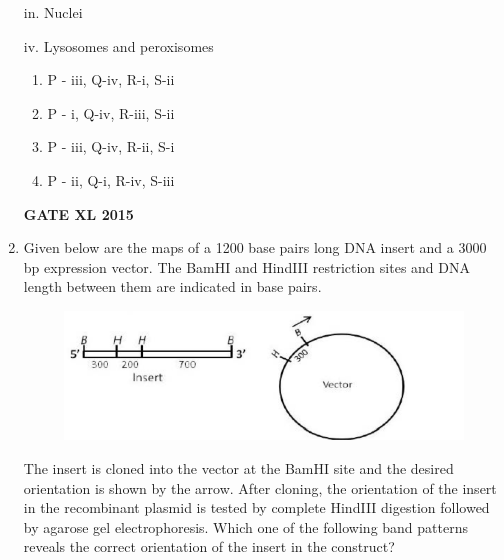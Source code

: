 \documentclass[journal,12pt,onecolumn]{IEEEtran}
\begin{document}
\begin{enumerate}
\begin{minipage}{0.5\textwidth}
\begin{flushleft}
in. Nuclei

iv. Lysosomes and peroxisomes
	\end{flushleft}
\end{minipage}
    \begin{enumerate}
            \item P - iii, Q-iv, R-i, S-ii
            \item P - i, Q-iv, R-iii, S-ii
            \item P - iii, Q-iv, R-ii, S-i
            \item P - ii, Q-i, R-iv, S-iii
    \end{enumerate}
\begin{flushright}\textbf{GATE XL 2015}\end{flushright}
\item Given below are the maps of a 1200 base pairs  long DNA insert and a 3000 bp expression vector. The BamHI  and HindIII  restriction sites and DNA length between them are indicated in base pairs.

	\begin{figure}[h!]
	\includegraphics[width=\textwidth]{45}
		    \caption*{}
		\label{fig:Q45}
	\end{figure}

The insert is cloned into the vector at the BamHI site and the desired orientation is shown by the arrow. After cloning, the orientation of the insert in the recombinant plasmid is tested by complete HindIII digestion followed by agarose gel electrophoresis. Which one of the following band patterns reveals the correct orientation of the insert in the construct?
    

\end{enumerate}
\end{document}
